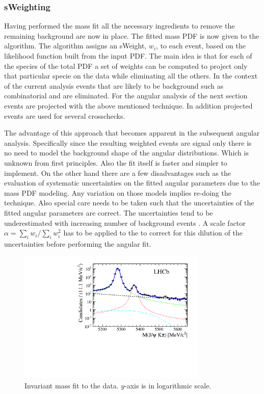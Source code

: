 \subsubsection{sWeighting}
Having performed the mass fit all the necessary ingredients to remove the remaining background are now in place. 
The fitted mass PDF is now given to the \sPlot algorithm. The algorithm assigns an sWeight, $w_i$, to each event,
based on the likelihood function built from the input PDF. The main idea is that for each of the species of the total
PDF a set of weights can be computed to project only that particular specie on the data while eliminating all the others.  
In the context of the current analysis events that are likely to be background such as combinatorial and \LbJpsippi are
eliminated. For the angular analysis of the next section \BsJpsiKst events are projected with the above mentioned technique.
In addition \BdJpsiKst projected events are used for several crosschecks. 

The advantage of this approach that becomes apparent in the subsequent angular analysis. Specifically since the resulting 
\BsJpsiKst weighted events are signal only there is no need to model the background shape of the angular distributions. Which
is unknown from first principles. Also the fit itself is faster and simpler to implement. On the other hand there are a few 
disadvantages such as the evaluation of systematic uncertainties on the fitted angular parameters due to the mass PDF modeling.
Any variation on those models implies re-doing the \sPlot technique. Also special care needs to be taken such that the uncertainties
of the fitted angular parameters are correct. The uncertainties tend to be underestimated with increasing number of background events \cite{splot}.
A scale factor $\alpha = \sum_{i} w_i /\sum_{i} w_i^2$  has to be applied to the \sWeights to correct for this dilution of the uncertainties
before performing the angular fit.

\begin{figure}[h]
\centering
\includegraphics[width=0.8\textwidth]{Figures/Chapter4/mass_plot_simul_log.pdf}
\caption{Invariant mass fit to the data. $y$-axis is in logarithmic scale.}
\label{mass_plot}
\end{figure}


